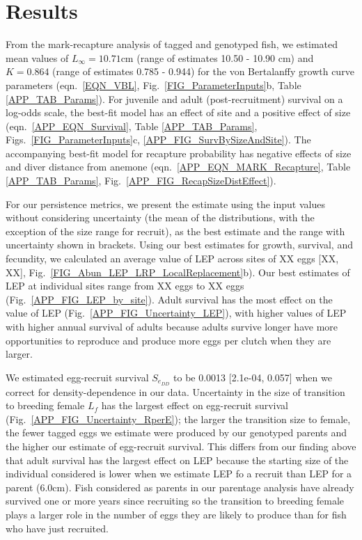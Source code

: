 \documentclass[12pt, oneside]{article}   	%
\begin{document}
\section*{Results}  
From the mark-recapture analysis of tagged and genotyped fish, we estimated mean values of $L_\infty = 10.71 \text{cm}$ (range of estimates 10.50 - 10.90 cm) and $K = 0.864$ (range of estimates 0.785 - 0.944) for the von Bertalanffy growth curve parameters (eqn.\ \ref{EQN_VBL}, Fig.\ \ref{FIG_ParameterInputs}b, Table \ref{APP_TAB_Params}). For juvenile and adult (post-recruitment) survival on a log-odds scale, the best-fit model has an effect of site and a positive effect of size (eqn.\ \ref{APP_EQN_Survival}, Table \ref{APP_TAB_Params}, Figs.\ \ref{FIG_ParameterInputs}c, \ref{APP_FIG_SurvBySizeAndSite}). The accompanying best-fit model for recapture probability has negative effects of size and diver distance from anemone (eqn.\ \ref{APP_EQN_MARK_Recapture}, Table \ref{APP_TAB_Params}, Fig.\ \ref{APP_FIG_RecapSizeDistEffect}).

For our persistence metrics, we present the estimate using the input values without considering uncertainty (the mean of the distributions, with the exception of the size range for recruit), as the best estimate and the range with uncertainty shown in brackets. Using our best estimates for growth, survival, and fecundity, we calculated an average value of LEP across sites of XX eggs [XX, XX], Fig.\ \ref{FIG_Abun_LEP_LRP_LocalReplacement}b). Our best estimates of LEP at individual sites range from XX eggs to XX eggs (Fig.\ \ref{APP_FIG_LEP_by_site}). Adult survival has the most effect on the value of LEP (Fig.\ \ref{APP_FIG_Uncertainty_LEP}), with higher values of LEP with higher annual survival of adults because adults survive longer have more opportunities to reproduce and produce more eggs per clutch when they are larger.

We estimated egg-recruit survival $S_{e_{DD}}$ to be 0.0013 [2.1e-04, 0.057] when we correct for density-dependence in our data. Uncertainty in the size of transition to breeding female $L_f$ has the largest effect on egg-recruit survival (Fig.\ \ref{APP_FIG_Uncertainty_RperE}); the larger the transition size to female, the fewer tagged eggs we estimate were produced by our genotyped parents and the higher our estimate of egg-recruit survival. This differs from our finding above that adult survival has the largest effect on LEP because the starting size of the individual considered is lower when we estimate LEP fo a recruit than LEP for a parent (6.0cm). Fish considered as parents in our parentage analysis have already survived one or more years since recruiting so the transition to breeding female plays a larger role in the number of eggs they are likely to produce than for fish who have just recruited. %
\end{document}

